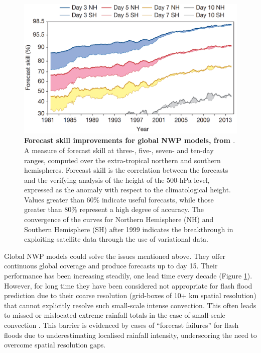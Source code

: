 \begin{figure}[htbp]
\centering
\includegraphics[width=\textwidth]{Figures/Chapter_02/improvement_forecast_skill.png}
\caption{\textbf{Forecast skill improvements for global NWP models, from \citet{Bauer_2015}}. A measure of forecast skill at three-, five-, seven- and ten-day ranges, computed over the extra-tropical northern and southern hemispheres. Forecast skill is the correlation between the forecasts and the verifying analysis of the height of the 500-hPa level, expressed as the anomaly with respect to the climatological height. Values greater than 60\% indicate useful forecasts, while those greater than 80\% represent a high degree of accuracy. The convergence of the curves for Northern Hemisphere (NH) and Southern Hemisphere (SH) after 1999 indicates the breakthrough in exploiting satellite data through the use of variational data.}
\label{fig:improvement_forecast_skill}
\end{figure}

Global NWP models could solve the issues mentioned above. They offer continuous global coverage and produce forecasts up to day 15. Their performance has been increasing steadily, one lead time every decade (Figure \ref{fig:improvement_forecast_skill}). However, for long time they have been considered not appropriate for flash flood prediction due to their coarse resolution (grid-boxes of 10+ km spatial resolution) that cannot explicitly resolve such small-scale intense convection. This often leads to missed or mislocated extreme rainfall totals in the case of small-scale convection \citep{Schumacher_2017}. This barrier is evidenced by cases of “forecast failures” for flash floods due to underestimating localised rainfall intensity, underscoring the need to overcome spatial resolution gaps. 

